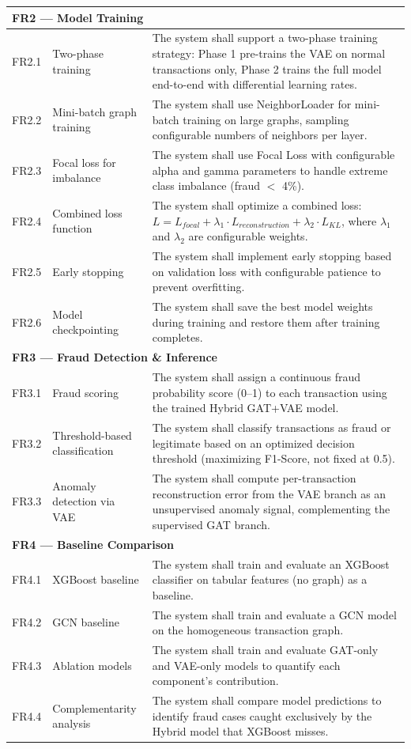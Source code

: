 \begin{table}[h!]
\begin{tabular}{|c|p{4cm}|p{8cm}|}
\multicolumn{3}{|l|}{\textbf{FR2 — Model Training}} \\
\hline
FR2.1 & Two-phase training & The system shall support a two-phase training strategy: Phase 1 pre-trains the VAE on normal transactions only, Phase 2 trains the full model end-to-end with differential learning rates. \\
\hline
FR2.2 & Mini-batch graph training & The system shall use NeighborLoader for mini-batch training on large graphs, sampling configurable numbers of neighbors per layer. \\
\hline
FR2.3 & Focal loss for imbalance & The system shall use Focal Loss with configurable alpha and gamma parameters to handle extreme class imbalance (fraud $<$ 4\%). \\
\hline
FR2.4 & Combined loss function & The system shall optimize a combined loss: $L = L_{focal} + \lambda_1 \cdot L_{reconstruction} + \lambda_2 \cdot L_{KL}$, where $\lambda_1$ and $\lambda_2$ are configurable weights. \\
\hline
FR2.5 & Early stopping & The system shall implement early stopping based on validation loss with configurable patience to prevent overfitting. \\
\hline
FR2.6 & Model checkpointing & The system shall save the best model weights during training and restore them after training completes. \\
\hline

\multicolumn{3}{|l|}{\textbf{FR3 — Fraud Detection \& Inference}} \\
\hline
FR3.1 & Fraud scoring & The system shall assign a continuous fraud probability score (0--1) to each transaction using the trained Hybrid GAT+VAE model. \\
\hline
FR3.2 & Threshold-based classification & The system shall classify transactions as fraud or legitimate based on an optimized decision threshold (maximizing F1-Score, not fixed at 0.5). \\
\hline
FR3.3 & Anomaly detection via VAE & The system shall compute per-transaction reconstruction error from the VAE branch as an unsupervised anomaly signal, complementing the supervised GAT branch. \\
\hline

\multicolumn{3}{|l|}{\textbf{FR4 — Baseline Comparison}} \\
\hline
FR4.1 & XGBoost baseline & The system shall train and evaluate an XGBoost classifier on tabular features (no graph) as a baseline. \\
\hline
FR4.2 & GCN baseline & The system shall train and evaluate a GCN model on the homogeneous transaction graph. \\
\hline
FR4.3 & Ablation models & The system shall train and evaluate GAT-only and VAE-only models to quantify each component's contribution. \\
\hline
FR4.4 & Complementarity analysis & The system shall compare model predictions to identify fraud cases caught exclusively by the Hybrid model that XGBoost misses. \\
\hline


\end{tabular}
\end{table}
